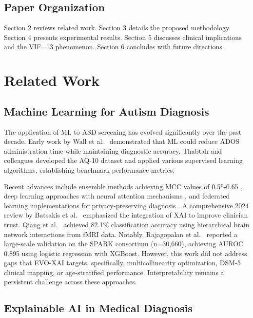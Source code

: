 \documentclass[pdflatex,sn-vancouver-num]{sn-jnl}
\begin{document}
\subsection{Paper Organization}\label{paper-organization}

Section 2 reviews related work. Section 3 details the proposed methodology. Section 4 presents experimental results. Section 5 discusses clinical implications and the VIF=13 phenomenon. Section 6 concludes with future directions.

\section{Related Work}\label{related-work}

\subsection{Machine Learning for Autism Diagnosis}\label{machine-learning-for-autism-diagnosis}

The application of ML to ASD screening has evolved significantly over the past decade. Early work by Wall et al.~\cite{ref24} demonstrated that ML could reduce ADOS administration time while maintaining diagnostic accuracy. Thabtah and colleagues \cite{ref5,ref25} developed the AQ-10 dataset and applied various supervised learning algorithms, establishing benchmark performance metrics.

Recent advances include ensemble methods achieving MCC values of 0.55-0.65 \cite{ref10,ref26}, deep learning approaches with neural attention mechanisms \cite{ref11,ref27}, and federated learning implementations for privacy-preserving diagnosis \cite{ref28}. A comprehensive 2024 review by Batsakis et al.~\cite{ref29} emphasized the integration of XAI to improve clinician trust. Qiang et al.~\cite{ref30} achieved 82.1\% classification accuracy using hierarchical brain network interactions from fMRI data. Notably, Rajagopalan et al.~\cite{ref31} reported a large-scale validation on the SPARK consortium (n=30,660), achieving AUROC 0.895 using logistic regression with XGBoost. However, this work did not address gaps that EVO-XAI targets, specifically, multicollinearity optimization, DSM-5 clinical mapping, or age-stratified performance. Interpretability remains a persistent challenge across these approaches.

\subsection{Explainable AI in Medical Diagnosis}\label{explainable-ai-in-medical-diagnosis}
\end{document}
